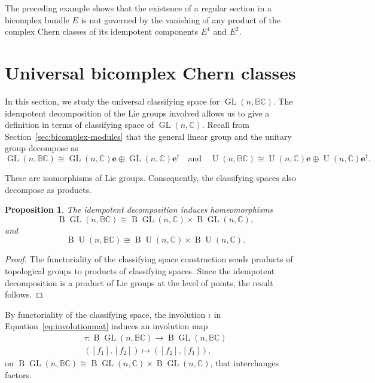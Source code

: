 \documentclass[11pt]{amsart}
\newcommand{\BC}{\mathbb{BC}}       %
\newcommand{\C}{\mathbb{C}}          %
\newcommand{\B}{\operatorname{B}}
\newcommand{\e}{\mathbf{e}}          %
\newcommand{\ed}{\mathbf{e}^\dagger} %
\newcommand{\GL}{\operatorname{GL}}  %
\newcommand{\U}{\operatorname{U}}    %
\newtheorem{prop}{Proposition}[section]   %
\theoremstyle{definition}
\begin{document}
The preceding example shows that the existence of a regular section in a bicomplex bundle $E$ is not governed by the vanishing of any product of the complex Chern classes of its idempotent components $E^{1}$ and $E^{2}$. 


\section{Universal bicomplex Chern classes}

In this section, we study the universal  classifying space for $\GL(n,\BC)$. The idempotent decomposition of the Lie groups involved allows us to give a definition in terms of classifying space of $\GL(n,\C)$. Recall from Section~\ref{sec:bicomplex-modules} that the general linear group and the unitary group decompose as
\begin{equation*}
    \GL(n,\BC) \cong \GL(n,\C)\e \oplus \GL(n,\C)\ed\quad\text{and}\quad
    \U(n,\BC) \cong \U(n,\C)\e \oplus \U(n,\C)\ed.
\end{equation*}



These are isomorphisms of Lie groups. Consequently, the classifying spaces also decompose as products.

\begin{prop}\label{prop:classifying_spaces}
    The idempotent decomposition induces homeomorphisms
    \begin{equation*}
        \B\!\GL(n,\BC) \cong \B\!\GL(n,\C) \times \B\!\GL(n,\C),
    \end{equation*}
    and
    \begin{equation*}
        \B\!\U(n,\BC) \cong \B\!\U(n,\C) \times \B\!\U(n,\C).
    \end{equation*}
\end{prop}

\begin{proof}
    The functoriality of the classifying space construction sends products of topological groups to products of classifying spaces. Since the idempotent decomposition is a product of Lie groups at the level of points, the result follows.
\end{proof}

By functoriality of the classifying space, the involution $\iota$ in Equation~\ref{eq:involutionmat} induces an involution map
\begin{equation}\label{eq:involution-esp}
\begin{gathered}
\tau:\B\!\GL(n,\BC)\to\B\!\GL(n,\BC)\\
([f_{1}],[f_{2}])\mapsto([f_{2}],[f_{1}]),
\end{gathered}
\end{equation}
on $\B\!\GL(n,\BC)\cong\B\!\GL(n,\C)\times\B\!\GL(n,\C)$, that interchanges factors.
\end{document}
